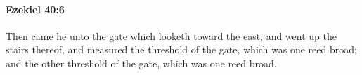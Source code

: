 
		\paragraph{Ezekiel 40:6} %
			\label{EZEKIEL-40-6}

			Then came he unto the gate which looketh toward the east, and went up the stairs thereof, and measured the threshold of the gate, which was one reed broad; and the other threshold of the gate, which was one reed broad.


